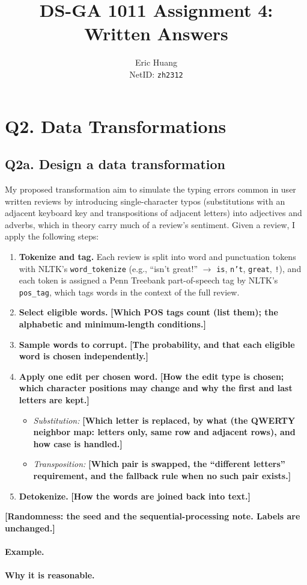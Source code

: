 \documentclass[11pt]{article}
\title{DS-GA 1011 Assignment 4: Written Answers}
\author{Eric Huang \\ NetID: \texttt{zh2312}}
\date{}
\begin{document}
\maketitle

\section*{Q2. Data Transformations}

\subsection*{Q2a. Design a data transformation}

\newcommand{\blank}[1]{\textbf{[#1]}}
My proposed transformation aim to simulate the typing errors common in user written reviews by introducing single-character typos (substitutions with an adjacent keyboard key and transpositions of adjacent letters) into adjectives and adverbs, which in theory carry much of a review's sentiment.
Given a review, I apply the following steps:
\begin{enumerate}[label=\arabic*.]
  \item \textbf{Tokenize and tag.} Each review is split into word and punctuation tokens with NLTK's \texttt{word\_tokenize} (e.g., ``isn't great!'' $\rightarrow$ \texttt{is}, \texttt{n't}, \texttt{great}, \texttt{!}), and each token is assigned a Penn Treebank part-of-speech tag by NLTK's \texttt{pos\_tag}, which tags words in the context of the full review.
  \item \textbf{Select eligible words.} \blank{Which POS tags count (list them); the alphabetic and minimum-length conditions.}
  \item \textbf{Sample words to corrupt.} \blank{The probability, and that each eligible word is chosen independently.}
  \item \textbf{Apply one edit per chosen word.} \blank{How the edit type is chosen; which character positions may change and why the first and last letters are kept.}
  \begin{itemize}
    \item \emph{Substitution:} \blank{Which letter is replaced, by what (the QWERTY neighbor map: letters only, same row and adjacent rows), and how case is handled.}
    \item \emph{Transposition:} \blank{Which pair is swapped, the ``different letters'' requirement, and the fallback rule when no such pair exists.}
  \end{itemize}
  \item \textbf{Detokenize.} \blank{How the words are joined back into text.}
\end{enumerate}
\blank{Randomness: the seed and the sequential-processing note. Labels are unchanged.}

\paragraph{Example.}

\paragraph{Why it is reasonable.}
\end{document}
